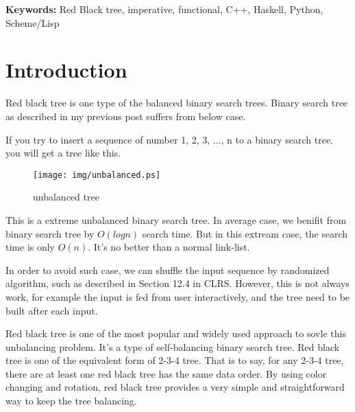 \documentclass{article}
\begin{document}
\vspace{3cm}
{\bfseries Keywords:} Red Black tree, imperative, functional, C++, Haskell, Python, Scheme/Lisp


\maketitle

\section{Introduction}
\label{introduction}

Red black tree is one type of the balanced binary search trees. Binary search tree as described
in my previous post\cite{bst-lxy} suffers from below case.

If you try to insert a sequence of number 1, 2, 3, ..., n to a binary search tree. you will get a tree like this.

\begin{figure}[htbp]
       \begin{center}
	\texttt{[image: img/unbalanced.ps]}
        \caption{unbalanced tree} \label{fig:unbalanced-tree}
       \end{center}
\end{figure}

This is a extreme unbalanced binary search tree. In average case, we benifit from binary search tree by $O(log n)$ search time. But in this extream case, the search time is only $O(n)$. It's no better than a normal link-list.

In order to avoid such case, we can shuffle the input sequence by randomized algorithm, such as described in Section 12.4 in CLRS\cite{CLRS}. However, this is not always work, for example the input is fed from user interactively, and the tree need to be built after each input.

Red black tree is one of the most popular and widely used approach to sovle this unbalancing problem. It's a type of self-balancing binary search tree\cite{wiki}. Red black tree is one of the equivalent form of 2-3-4 tree. That is to say, for any 2-3-4 tree, there are at least one red black tree has the same data order. By using color changing and rotation, red black tree provides a very simple and straightforward way to keep the tree balancing.
\end{document}
